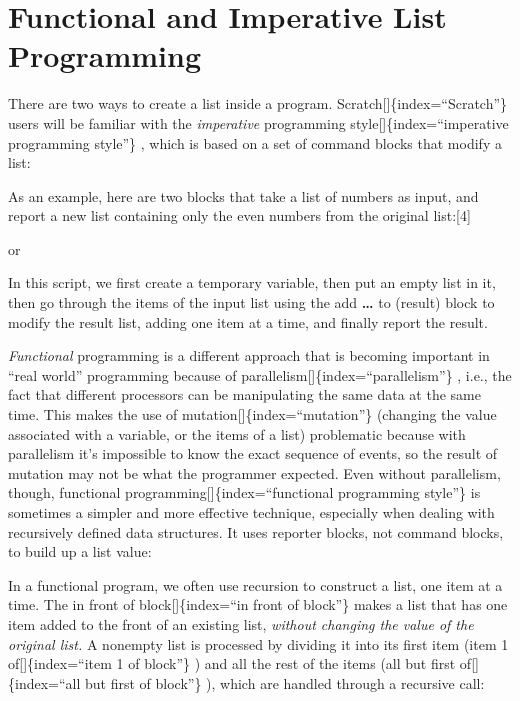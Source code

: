 \documentclass[
  letterpaper,
]{book}
\begin{document}
\section{Functional and Imperative List
Programming}\label{functional-and-imperative-list-programming}

There are two ways to create a list inside a program.
Scratch{[}{]}\{index=``Scratch''\} users will be familiar with the
\emph{imperative} programming style{[}{]}\{index=``imperative
programming style''\} , which is based on a set of command blocks that
modify a list:

As an example, here are two blocks that take a list of numbers as input,
and report a new list containing only the even numbers from the original
list:{[}4{]}

or

In this script, we first create a temporary variable, then put an empty
list in it, then go through the items of the input list using the add
\textbf{\ldots{}} to (result) block to modify the result list, adding
one item at a time, and finally report the result.

\emph{Functional} programming is a different approach that is becoming
important in ``real world'' programming because of
parallelism{[}{]}\{index=``parallelism''\} , i.e., the fact that
different processors can be manipulating the same data at the same time.
This makes the use of mutation{[}{]}\{index=``mutation''\} (changing the
value associated with a variable, or the items of a list) problematic
because with parallelism it's impossible to know the exact sequence of
events, so the result of mutation may not be what the programmer
expected. Even without parallelism, though, functional
programming{[}{]}\{index=``functional programming style''\} is sometimes
a simpler and more effective technique, especially when dealing with
recursively defined data structures. It uses reporter blocks, not
command blocks, to build up a list value:

In a functional program, we often use recursion to construct a list, one
item at a time. The in front of block{[}{]}\{index=``in front of
block''\} makes a list that has one item added to the front of an
existing list, \emph{without changing the value of the original list.} A
nonempty list is processed by dividing it into its first item (item 1
of{[}{]}\{index=``item 1 of block''\} ) and all the rest of the items
(all but first of{[}{]}\{index=``all but first of block''\} ), which are
handled through a recursive call:
\end{document}
